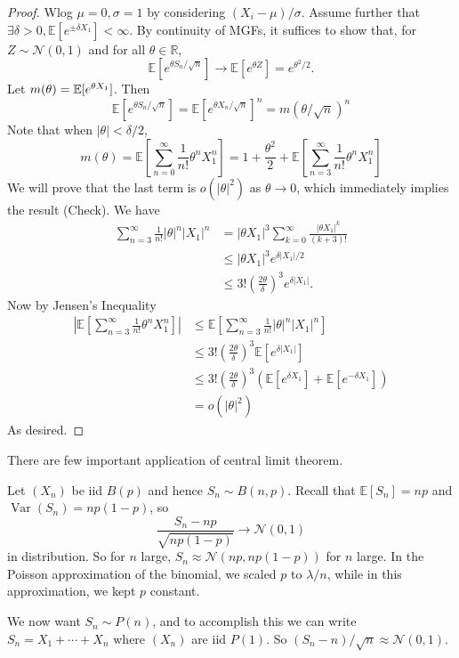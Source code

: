 \begin{proof}
    Wlog $\mu=0,\sigma=1$ by considering $(X_i-\mu)/\sigma$.
    Assume further that $\exists\delta>0,\mathbb E[e^{\pm\delta X_1}]<\infty$.
    By continuity of MGFs, it suffices to show that, for $Z\sim\mathcal N(0,1)$ and for all $ \theta\in \mathbb{R} $,
    $$\mathbb E[e^{\theta S_n/\sqrt{n}}]\to\mathbb E[e^{\theta Z}]=e^{\theta^2/2}.$$
    Let $ m(\theta)={\mathbb{E}}[e^{\theta X_1}] $. Then 
    $$\mathbb E[e^{\theta S_n/\sqrt{n}}]=\mathbb E[e^{\theta X_n/\sqrt{n}}]^n=m(\theta/\sqrt{n})^n$$
    Note that when $|\theta|<\delta/2$,
    $$m(\theta)=\mathbb E\left[ \sum_{n=0}^\infty\frac{1}{n!}\theta^nX_1^n \right]=1+\frac{\theta^2}{2}+\mathbb E\left[  \sum_{n=3}^\infty\frac{1}{n!}\theta^nX_1^n \right]$$
    We will prove that the last term is $o(|\theta|^2)$ as $\theta\to 0$, which immediately implies the result (Check). We have
    \begin{align*}
        \sum_{n=3}^\infty\frac{1}{n!}|\theta|^n|X_1|^n&=|\theta X_1|^3\sum_{k=0}^\infty\frac{|\theta X_1|^k}{(k+3)!}\\
        &\le|\theta X_1|^3e^{\delta|X_1|/2}\\
        &\le 3!\left( \frac{2\theta}{\delta} \right)^3e^{\delta|X_1|}.
    \end{align*}
    Now by Jensen's Inequality
    \begin{align*}
        \left|\mathbb E\left[  \sum_{n=3}^\infty\frac{1}{n!}\theta^nX_1^n \right]\right|&\le\mathbb E\left[ \sum_{n=3}^\infty\frac{1}{n!}|\theta|^n|X_1|^n \right]\\
        &\le 3!\left( \frac{2\theta}{\delta} \right)^3\mathbb E[e^{\delta|X_1|}]\\
        &\le 3!\left( \frac{2\theta}{\delta} \right)^3(\mathbb E[e^{\delta X_1}]+\mathbb E[e^{-\delta X_1}])\\
        &=o(|\theta|^2)
    \end{align*}
    As desired.
\end{proof}
There are few important application of central limit theorem.
\begin{example}
    Let $(X_n)$ be iid $B(p)$ and hence $S_n\sim B(n,p)$.
    Recall that $\mathbb E[S_n]=np$ and $\operatorname{Var}(S_n)=np(1-p)$, so
    $$\frac{S_n-np}{\sqrt{np(1-p)}}\to\mathcal N(0,1)$$
    in distribution.
    So for $n$ large, $S_n\approx\mathcal N(np,np(1-p))$ for $n$ large.
    In the Poisson approximation of the binomial, we scaled $p$ to $\lambda/n$, while in this approximation, we kept $p$ constant.
\end{example}
\begin{example}
    We now want $S_n\sim P(n)$, and to accomplish this we can write $S_n=X_1+\cdots+X_n$ where $(X_n)$ are iid $P(1)$.
    So $(S_n-n)/\sqrt{n}\approx \mathcal N(0,1)$.
\end{example}

